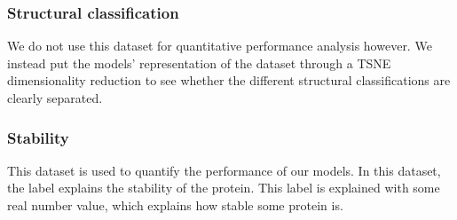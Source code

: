 \subsubsection{Structural classification}
We do not use this dataset for quantitative performance analysis however. We instead put the models' representation of the dataset through a TSNE dimensionality reduction to see whether the different structural classifications are clearly separated. 

\subsubsection{Stability}
This dataset is used to quantify the performance of our models. In this dataset, the label explains the stability of the protein. This label is explained with some real number value, which explains how stable some protein is.
